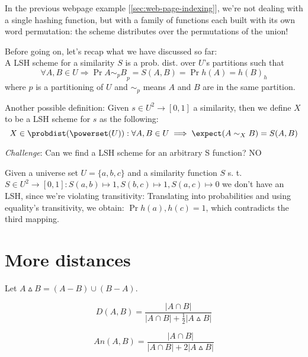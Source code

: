 \obs In the previous webpage example [\ref{sec:web-page-indexing}], we're not dealing with a single hashing function, but with a family of functions each built with its own word permutation: the scheme distributes over the permutations of the union!


Before going on, let's recap what we have discussed so far: \\
A LSH scheme for a similarity $S$ is a prob. dist. over $U$'s partitions such that 
\begin{equation}
	\forall A, B \in  U \Rightarrow \Pr{A\sim_p B}_p = S(A, B) = \Pr{h(A)=h(B)}_h
\end{equation}
where $p$ is a partitioning of $U$ and $\sim_p$ means $A$ and $B$ are in the same partition.

Another possible definition: Given $s \in U^2 \to [0,1]$ a similarity, then we define $X$ to be a LSH scheme for $s$ as the following:
\begin{equation}
X \in \probdist(\powerset(U)) : \forall A, B \in U \implies \expect(A\sim_X B) = S(A, B)
\end{equation}

\textit{Challenge}: Can we find a LSH scheme for an arbitrary S function? NO

\ex \label{ex:transitivity} Given a universe set $U = \{a, b, c\}$ and a similarity function $S$ s. t.	$S \in U^2 \rightarrow [0, 1] : S(a, b) \mapsto 1, S(b, c) \mapsto 1, S(a, c) \mapsto 0$ we don't have an LSH, since we're violating transitivity:
Translating into probabilities and using equality's transitivity, we obtain: $\Pr{h(a), h(c)}=1$, which contradicts the third mapping.

\section{More distances}
Let $A \vartriangle B = (A-B) \cup (B-A)$.

\begin{defn}
	\begin{equation}
	\displaystyle D(A, B) = \frac{|A\cap B|}{|A\cap B| + \frac{1}{2}|A\vartriangle B|}
	\end{equation}
\end{defn}

\begin{defn}
	\begin{equation}
	\displaystyle An(A, B) = \frac{|A\cap B|}{|A\cap B| + 2|A\vartriangle B|}
	\end{equation}
\end{defn}

